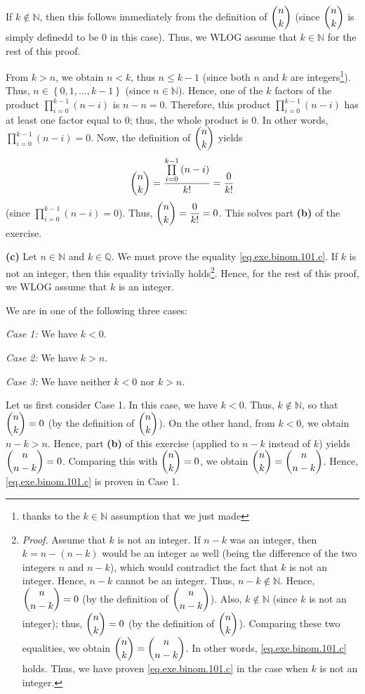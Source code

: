 \documentclass[paper=a4, fontsize=12pt]{scrartcl} %
\newcommand{\QQ}{\mathbb{Q}} %
\newcommand{\NN}{\mathbb{N}} %
\newcommand{\set}[1]{\left\{ #1 \right\}}
\newcommand{\tup}[1]{\left( #1 \right)}
\let\prodnonlimits\prod
\renewcommand{\prod}{\prodnonlimits\limits}
\theoremstyle{plainsl}
\theoremstyle{definition}
\theoremstyle{remark}
\begin{document}
If $k \notin \NN$, then this follows immediately from the
definition of $\dbinom{n}{k}$ (since $\dbinom{n}{k}$ is
simply definedd to be $0$ in this case).
Thus, we WLOG assume that $k \in \NN$ for the rest of this
proof.

From $k > n$, we obtain $n < k$, thus $n \leq k-1$
(since both $n$ and $k$ are integers\footnote{thanks to
the $k \in \NN$ assumption that we just made}).
Thus, $n \in \set{0, 1, \ldots, k-1}$ (since $n \in \NN$).
Hence, one of the $k$ factors of the product
$\prod_{i=0}^{k-1} \tup{n-i}$ is $n-n = 0$.
Therefore, this product $\prod_{i=0}^{k-1} \tup{n-i}$
has at least one factor equal to $0$; thus, the whole
product is $0$.
In other words, $\prod_{i=0}^{k-1} \tup{n-i} = 0$.
Now, the definition of $\dbinom{n}{k}$ yields
\[
\dbinom{n}{k}
= \dfrac{ \prod_{i=0}^{k-1} \tup{n-i} }{k!}
= \dfrac{0}{k!}
\]
(since $\prod_{i=0}^{k-1} \tup{n-i} = 0$).
Thus, $\dbinom{n}{k} = \dfrac{0}{k!} = 0$.
This solves part \textbf{(b)} of the exercise.

\vspace{0.8pc}

\textbf{(c)}
Let $n \in \NN$ and $k \in \QQ$.
We must prove the equality \eqref{eq.exe.binom.101.c}.
If $k$ is not an integer, then this equality trivially
holds\footnote{\textit{Proof.} Assume that $k$ is not
an integer. If $n-k$ was an integer, then
$k = n - \tup{n-k}$ would be an integer as well (being
the difference of the two integers $n$ and $n-k$),
which would contradict the fact that $k$ is not an
integer.
Hence, $n-k$ cannot be an integer.
Thus, $n-k \notin \NN$.
Hence, $\dbinom{n}{n-k} = 0$ (by the definition of
$\dbinom{n}{n-k}$).
Also, $k \notin \NN$ (since $k$ is not an integer); thus,
$\dbinom{n}{k} = 0$ (by the definition of $\dbinom{n}{k}$).
Comparing these two equalities, we obtain
$\dbinom{n}{k} = \dbinom{n}{n-k}$.
In other words, \eqref{eq.exe.binom.101.c} holds.
Thus, we have proven \eqref{eq.exe.binom.101.c} in the case
when $k$ is not an integer.}.
Hence, for the rest of this proof, we WLOG assume that $k$
is an integer.

We are in one of the following three cases:

\textit{Case 1:} We have $k < 0$.

\textit{Case 2:} We have $k > n$.

\textit{Case 3:} We have neither $k < 0$ nor $k > n$.

Let us first consider Case 1.
In this case, we have $k < 0$.
Thus, $k \notin \NN$, so that $\dbinom{n}{k} = 0$
(by the definition of $\dbinom{n}{k}$).
On the other hand, from $k < 0$, we obtain $n-k > n$.
Hence, part \textbf{(b)} of this exercise (applied to $n-k$
instead of $k$) yields $\dbinom{n}{n-k} = 0$.
Comparing this with $\dbinom{n}{k} = 0$, we obtain
$\dbinom{n}{k} = \dbinom{n}{n-k}$.
Hence, \eqref{eq.exe.binom.101.c} is proven in Case 1.
\end{document}
